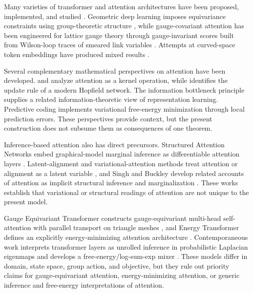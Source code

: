 \documentclass[twoside,11pt]{article}
\begin{document}
Many varieties of transformer and attention architectures have been proposed, implemented, and studied \citep{fuchs2020se3,thomas2018tensor}. Geometric deep learning imposes equivariance constraints using group-theoretic structure \citep{cohen2019gauge,kondor2018generalization,finzi2020generalizing,bronstein2021geometric}, while gauge-covariant attention has been engineered for lattice gauge theory through gauge-invariant scores built from Wilson-loop traces of smeared link variables \citep{he2025cask}. Attempts at curved-space token embeddings have produced mixed results \citep{bonnabel2013stochastic,Absil2008}.

Several complementary mathematical perspectives on attention have been developed. \citet{tsai2019transformer} and \citet{katharopoulos2020transformers} analyze attention as a kernel operation, while \citet{ramsauer2021hopfield} identifies the update rule of a modern Hopfield network. The information bottleneck principle \citep{tishby2015deep,shwartz2017opening} supplies a related information-theoretic view of representation learning. Predictive coding \citep{rao1999predictive,bogacz2017tutorial,millidge2021predictive} implements variational free-energy minimization through local prediction errors. These perspectives provide context, but the present construction does not subsume them as consequences of one theorem.

Inference-based attention also has direct precursors. Structured Attention Networks embed graphical-model marginal inference as differentiable attention layers \citep{Kim2017StructuredAttention}. Latent-alignment and variational-attention methods treat attention or alignment as a latent variable \citep{Deng2018LatentAlignment,Bahuleyan2018VariationalAttention}, and Singh and Buckley develop related accounts of attention as implicit structural inference and marginalization \citep{Singh2023ImplicitStructuralInference,Singh2023MarginalProbability}. These works establish that variational or structural readings of attention are not unique to the present model.

Gauge Equivariant Transformer constructs gauge-equivariant multi-head self-attention with parallel transport on triangle meshes \citep{He2021GaugeEquivariantTransformer}, and Energy Transformer defines an explicitly energy-minimizing attention architecture \citep{Hoover2023EnergyTransformer}. Contemporaneous work interprets transformer layers as unrolled inference in probabilistic Laplacian eigenmaps \citep{Ravuri2026UnrolledInference} and develops a free-energy/log-sum-exp mixer \citep{Lu2026FreeEnergyMixer}. These models differ in domain, state space, group action, and objective, but they rule out priority claims for gauge-equivariant attention, energy-minimizing attention, or generic inference and free-energy interpretations of attention.
\end{document}
